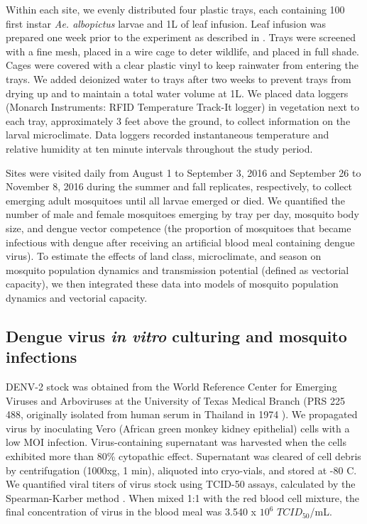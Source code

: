 \documentclass[12pt]{article}
\begin{document}
Within each site, we evenly distributed four plastic trays, each containing 100 first instar \textit{Ae. albopictus} larvae and 1L of leaf infusion. Leaf infusion was prepared one week prior to the experiment as described in \citet{murdock2017}.  Trays were screened with a fine mesh, placed in a wire cage to deter wildlife, and placed in full shade. Cages were covered with a clear plastic vinyl to keep rainwater from entering the trays. We added deionized water to trays after two weeks to prevent trays from drying up and to maintain a total water volume at 1L. We placed data loggers (Monarch Instruments: RFID Temperature Track-It logger) in vegetation next to each tray, approximately 3 feet above the ground, to collect information on the larval microclimate. Data loggers recorded instantaneous temperature and relative humidity at ten minute intervals throughout the study period.

Sites were visited daily from August 1 to September 3, 2016 and September 26 to November 8, 2016 during the summer and fall replicates, respectively, to collect emerging adult mosquitoes until all larvae emerged or died. We quantified the number of male and female mosquitoes emerging by tray per day, mosquito body size, and dengue vector competence (the proportion of mosquitoes that became infectious with dengue after receiving an artificial blood meal containing dengue virus). To estimate the effects of land class, microclimate, and season on mosquito population dynamics and transmission potential (defined as vectorial capacity), we then integrated these data into models of mosquito population dynamics and vectorial capacity. 

\subsection{Dengue virus \textit{in vitro} culturing and mosquito infections}
DENV-2 stock was obtained from the World Reference Center for Emerging Viruses and Arboviruses at the University of Texas Medical Branch (PRS 225 488, originally isolated from human serum in Thailand in 1974 \citep{vazeille-falcoz1999}). We propagated virus by inoculating Vero (African green monkey kidney epithelial) cells with a low MOI infection. Virus-containing supernatant was harvested when the cells exhibited more than 80\% cytopathic effect. Supernatant was cleared of cell debris by centrifugation (1000xg, 1 min), aliquoted into cryo-vials, and stored at -80 \degree C. We quantified viral titers of virus stock using TCID-50 assays, calculated by the Spearman-Karber method \citep{shao2016}. When mixed 1:1 with the red blood cell mixture, the final concentration of virus in the blood meal was 3.540 x $10^6$ $TCID_{50}$/mL.
\end{document}
